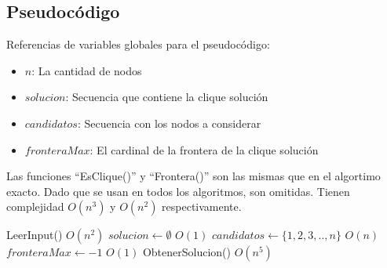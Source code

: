 \subsection{Pseudocódigo}

Referencias de variables globales para el pseudocódigo:
\begin{itemize}
    \item $n$: La cantidad de nodos
    \item $solucion$: Secuencia que contiene la clique solución
    \item $candidatos$: Secuencia con los nodos a considerar
    \item $fronteraMax$: El cardinal de la frontera de la clique solución
\end{itemize}

Las funciones ``EsClique()'' y ``Frontera()'' son las mismas que en el algortimo exacto. Dado que se usan en todos los algoritmos, son omitidas. Tienen complejidad $O(n^3)$ y $O(n^2)$ respectivamente.

\begin{algorithm}[H]
\begin{algorithmic}
    \State LeerInput()                              \Comment $O(n^2)$
    \State $solucion \gets \emptyset$               \Comment $O(1)$
    \State $candidatos \gets \{1, 2, 3, .. , n\} $  \Comment $O(n)$
    \State $fronteraMax \gets -1$                   \Comment $O(1)$
    \State ObtenerSolucion()                        \Comment $O(n^5)$
\EndFunction
\end{algorithmic}
\end{algorithm}



